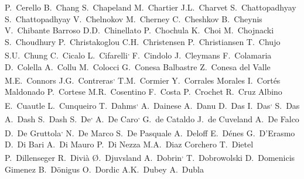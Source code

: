 \begin{flushleft}
P.~Cerello\And
B.~Chang\And
S.~Chapeland\And
M.~Chartier\And
J.L.~Charvet\And
S.~Chattopadhyay\And
S.~Chattopadhyay\And
V.~Chelnokov\And
M.~Cherney\And
C.~Cheshkov\And
B.~Cheynis\And
V.~Chibante Barroso\And
D.D.~Chinellato\And
P.~Chochula\And
K.~Choi\And
M.~Chojnacki\And
S.~Choudhury\And
P.~Christakoglou\And
C.H.~Christensen\And
P.~Christiansen\And
T.~Chujo\And
S.U.~Chung\And
C.~Cicalo\And
L.~Cifarelli\textsuperscript{,}\And
F.~Cindolo\And
J.~Cleymans\And
F.~Colamaria\And
D.~Colella\And
A.~Collu\And
M.~Colocci\And
G.~Conesa Balbastre\And
Z.~Conesa del Valle\And
M.E.~Connors\And
J.G.~Contreras\textsuperscript{,}\And
T.M.~Cormier\And
Y.~Corrales Morales\And
I.~Cort\'{e}s Maldonado\And
P.~Cortese\And
M.R.~Cosentino\And
F.~Costa\And
P.~Crochet\And
R.~Cruz Albino\And
E.~Cuautle\And
L.~Cunqueiro\And
T.~Dahms\textsuperscript{,}\And
A.~Dainese\And
A.~Danu\And
D.~Das\And
I.~Das\textsuperscript{,}\And
S.~Das\And
A.~Dash\And
S.~Dash\And
S.~De\textsuperscript{,}\And
A.~De Caro\textsuperscript{,}\And
G.~de Cataldo\And
J.~de Cuveland\And
A.~De Falco\And
D.~De Gruttola\textsuperscript{,}\And
N.~De Marco\And
S.~De Pasquale\And
A.~Deloff\And
E.~D\'{e}nes\And
G.~D'Erasmo\And
D.~Di Bari\And
A.~Di Mauro\And
P.~Di Nezza\And
M.A.~Diaz Corchero\And
T.~Dietel\And
P.~Dillenseger\And
R.~Divi\`{a}\And
{\O}.~Djuvsland\And
A.~Dobrin\textsuperscript{,}\And
T.~Dobrowolski\And
D.~Domenicis Gimenez\And
B.~D\"{o}nigus\And
O.~Dordic\And
A.K.~Dubey\And
A.~Dubla\And

\end{flushleft}
